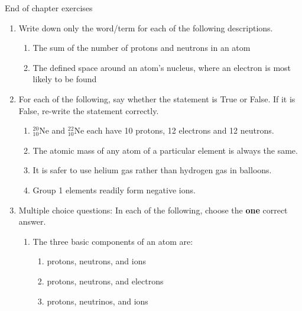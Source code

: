 \begin{eocexercises}{ End of chapter exercises}
            \nopagebreak
      \label{m38741*id263110}\begin{enumerate}[noitemsep, label=\textbf{\arabic*}. ] 
            \label{m38741*uid189}\item Write down only the word/term for each of the following descriptions.
\label{m38741*id263126}\begin{enumerate}[noitemsep, label=\textbf{\alph*}. ] 
            \label{m38741*uid190}\item The sum of the number of protons and neutrons in an atom
\label{m38741*uid191}\item The defined space around an atom's nucleus, where an electron is most likely to be found
\end{enumerate}
                \label{m38741*uid192}\item For each of the following, say whether the statement is True or False. If it is False, re-write the statement correctly.
\label{m38741*id263169}\begin{enumerate}[noitemsep, label=\textbf{\alph*}. ] 
            \label{m38741*uid193}\item $_{10}^{20}\mathrm{Ne}$ and $_{10}^{22}\mathrm{Ne}$ each have 10 protons, 12 electrons and 12 neutrons.
\label{m38741*uid194}\item The atomic mass of any atom of a particular element is always the same.
\label{m38741*uid195}\item It is safer to use helium gas rather than hydrogen gas in balloons.
\label{m38741*uid196}\item Group 1 elements readily form negative ions.
\end{enumerate}
                \label{m38741*uid197}\item Multiple choice questions: In each of the following, choose the \textbf{one} correct answer.
\label{m38741*id263273}\begin{enumerate}[noitemsep, label=\textbf{\alph*}. ] 
            \label{m38741*uid198}\item The three basic components of an atom are:
\label{m38741*id263289}\begin{enumerate}[noitemsep, label=\textbf{\alph*}. ] 
            \label{m38741*uid199}\item protons, neutrons, and ions
\label{m38741*uid200}\item protons, neutrons, and electrons
\label{m38741*uid201}\item protons, neutrinos, and ions

\end{enumerate}
\end{enumerate}
\end{enumerate}
\end{eocexercises}
